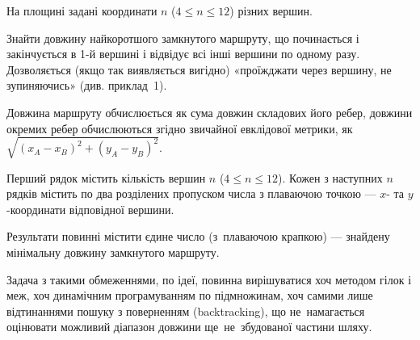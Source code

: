 ﻿На площині задані координати $n$ ($4\leqslant n\leqslant 12$) різних вершин.

Знайти довжину найкоротшого замкнутого маршруту, що починається і закінчується в 1-й вершині і відвідує всі інші вершини по одному разу. Дозволяється (якщо так виявляється вигідно) «проїжджати через вершину, не зупиняючись» (див. приклад~1).

Довжина маршруту обчислюється як сума довжин складових його ребер, довжини окремих ребер обчислюються згідно звичайної евклідової метрики, як $\sqrt{(x_A-x_B)^2+(y_A-y_B)^2}$.

\InputFile
Перший рядок містить кількість вершин $n$ ($4\leqslant n\leqslant 12$). Кожен з наступних $n$ рядків містить по два розділених пропуском числа з плаваючою точкою --- $x$- та $y$-координати відповідної вершини.

\OutputFile
Результати повинні містити єдине число (з~плаваючою крапкою) --- знайдену мінімальну довжину замкнутого маршруту.

\Examples
\begin{example}
\end{example}

\Note
Задача з такими обмеженнями, по ідеї, повинна вирішуватися хоч методом гілок і меж, хоч динамічним програмуванням по підмножинам, хоч самими лише відтинаннями пошуку з поверненням (backtracking), що не~намагається оцінювати можливий діапазон довжини ще~не~збудованої частини шляху. 
